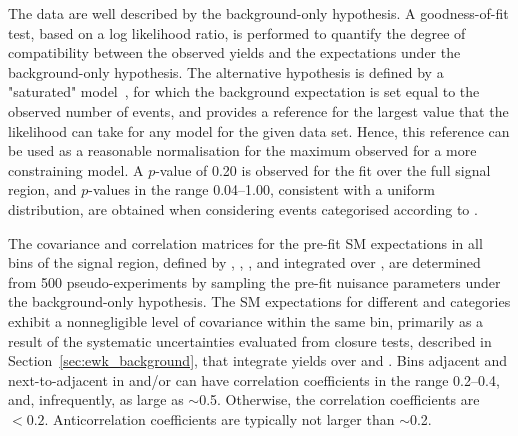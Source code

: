The data are well described by the background-only hypothesis. 
A goodness-of-fit test, based on a log likelihood ratio, is performed
to quantify the degree of compatibility between the observed yields
and the expectations under the background-only hypothesis. The
alternative hypothesis is defined by a "saturated"
model~\cite{sat-llk}, for which the background expectation is set
equal to the observed number of events, and provides a reference for
the largest value that the likelihood can take for any model for the
given data set. Hence, this reference can be used as a reasonable
normalisation for the maximum observed for a more constraining
model. A $p$-value of 0.20 is observed for the fit over the full
signal region, and $p$-values in the range 0.04--1.00, consistent with
a uniform distribution, are obtained when considering events
categorised according to \njet.

The covariance and correlation matrices for the pre-fit SM
expectations in all bins of the signal region, defined by \njet, \nb,
\scalht, and integrated over \HTmiss, are determined from 500
pseudo-experiments by sampling the pre-fit nuisance parameters under
the background-only hypothesis. The SM expectations for different
\njet and \nb categories exhibit a nonnegligible level of covariance
within the same \scalht bin, primarily as a result of the systematic
uncertainties evaluated from closure tests, described in
Section~\ref{sec:ewk_background}, that integrate yields over \njet and
\nb. Bins adjacent and next-to-adjacent in \njet and/or \nb can have
correlation coefficients in the range 0.2--0.4, and, infrequently, as
large as $\sim$0.5. Otherwise, the correlation coefficients are
$<0.2$. Anticorrelation coefficients are typically not larger than
$\sim$0.2.

